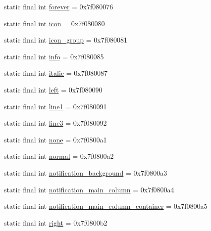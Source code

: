\begin{DoxyCompactItemize}
static final int \mbox{\hyperlink{classandroid_1_1support_1_1coreui_1_1_r_1_1id_a36dcc6cf4dd0fe587ac280966c92b655}{forever}} = 0x7f080076
\item 
static final int \mbox{\hyperlink{classandroid_1_1support_1_1coreui_1_1_r_1_1id_a98b9aa8151b1cf84e12e8e04f1bde7e5}{icon}} = 0x7f080080
\item 
static final int \mbox{\hyperlink{classandroid_1_1support_1_1coreui_1_1_r_1_1id_a215db00b79212e0e082308d19af3a2d6}{icon\+\_\+group}} = 0x7f080081
\item 
static final int \mbox{\hyperlink{classandroid_1_1support_1_1coreui_1_1_r_1_1id_a768cab4424f371839e8b9e05f341ea9a}{info}} = 0x7f080085
\item 
static final int \mbox{\hyperlink{classandroid_1_1support_1_1coreui_1_1_r_1_1id_ab7faa79cdfae716e227b401e6a756cb6}{italic}} = 0x7f080087
\item 
static final int \mbox{\hyperlink{classandroid_1_1support_1_1coreui_1_1_r_1_1id_aa822d414d0a9f276d0a8b6877759d8c1}{left}} = 0x7f080090
\item 
static final int \mbox{\hyperlink{classandroid_1_1support_1_1coreui_1_1_r_1_1id_aaa8a0952698af28f471fe64491e85c36}{line1}} = 0x7f080091
\item 
static final int \mbox{\hyperlink{classandroid_1_1support_1_1coreui_1_1_r_1_1id_a11398f0251793b4ff1b2d508f75802e9}{line3}} = 0x7f080092
\item 
static final int \mbox{\hyperlink{classandroid_1_1support_1_1coreui_1_1_r_1_1id_a9da8df6a0db3c835428fd3ece9aa11a5}{none}} = 0x7f0800a1
\item 
static final int \mbox{\hyperlink{classandroid_1_1support_1_1coreui_1_1_r_1_1id_a8c28c674124fa95312feac38a09526df}{normal}} = 0x7f0800a2
\item 
static final int \mbox{\hyperlink{classandroid_1_1support_1_1coreui_1_1_r_1_1id_a0b9af4a1e06b28761d436b676729f93a}{notification\+\_\+background}} = 0x7f0800a3
\item 
static final int \mbox{\hyperlink{classandroid_1_1support_1_1coreui_1_1_r_1_1id_a586a29236457147e23b87d5d0f2c7278}{notification\+\_\+main\+\_\+column}} = 0x7f0800a4
\item 
static final int \mbox{\hyperlink{classandroid_1_1support_1_1coreui_1_1_r_1_1id_a24527be0b778086c182e7c3d930d3803}{notification\+\_\+main\+\_\+column\+\_\+container}} = 0x7f0800a5
\item 
static final int \mbox{\hyperlink{classandroid_1_1support_1_1coreui_1_1_r_1_1id_a97ead7fdd3d2651d71172811b5f3c34b}{right}} = 0x7f0800b2

\end{DoxyCompactItemize}
